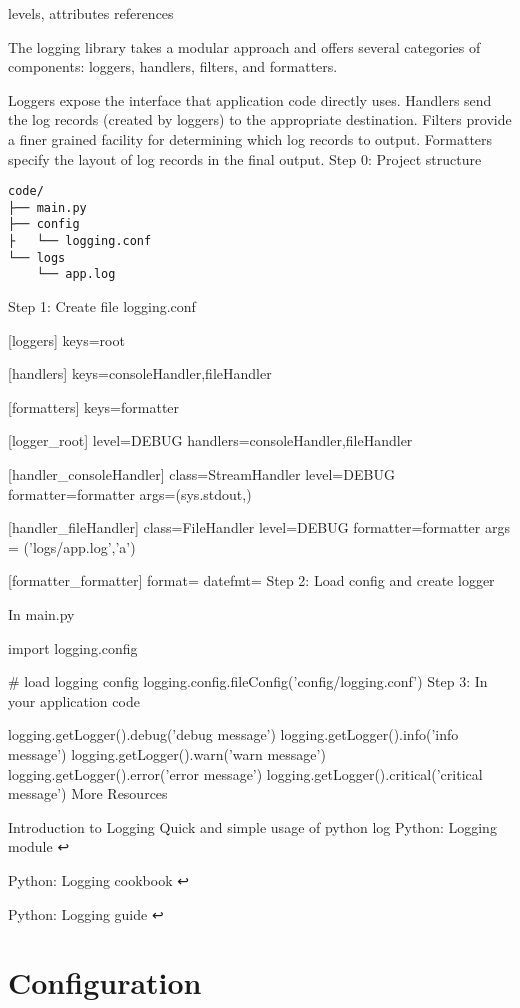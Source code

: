 levels, attributes references

The logging library takes a modular approach and offers several categories of components: loggers, handlers, filters, and formatters.

Loggers expose the interface that application code directly uses.
Handlers send the log records (created by loggers) to the appropriate destination.
Filters provide a finer grained facility for determining which log records to output.
Formatters specify the layout of log records in the final output.
Step 0: Project structure

\begin{lstlisting}
code/
├── main.py
├── config
├   └── logging.conf
└── logs
    └── app.log
\end{lstlisting}

Step 1: Create file logging.conf

[loggers]
keys=root

[handlers]
keys=consoleHandler,fileHandler

[formatters]
keys=formatter

[logger_root]
level=DEBUG
handlers=consoleHandler,fileHandler

[handler_consoleHandler]
class=StreamHandler
level=DEBUG
formatter=formatter
args=(sys.stdout,)

[handler_fileHandler]
class=FileHandler
level=DEBUG
formatter=formatter
args = ('logs/app.log','a')

[formatter_formatter]
format=%
datefmt=
Step 2: Load config and create logger

In main.py

import logging.config

# load logging config
logging.config.fileConfig('config/logging.conf')
Step 3: In your application code

logging.getLogger().debug('debug message')
logging.getLogger().info('info message')
logging.getLogger().warn('warn message')
logging.getLogger().error('error message')
logging.getLogger().critical('critical message')
More Resources

Introduction to Logging
Quick and simple usage of python log
Python: Logging module ↩

Python: Logging cookbook ↩

Python: Logging guide ↩

\section{Configuration}

